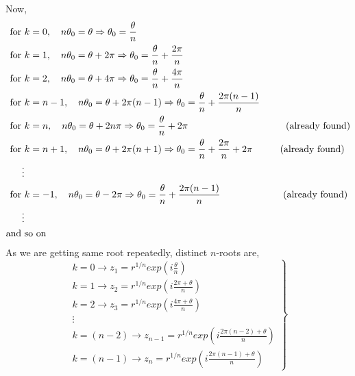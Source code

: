 \begin{ex}
\noindent Now,
\begin{align*}
   \text{for } & k=0, \quad n \theta_0=\theta \Rightarrow \theta_0=\frac{\theta}{n}\\
   \text{for } & k=1, \quad n \theta_0=\theta+2 \pi \Rightarrow \theta_0=\frac{\theta}{n}+\frac{2 \pi}{n}\\
   \text{for } & k=2, \quad n \theta_0=\theta+4 \pi \Rightarrow \theta_0=\frac{\theta}{n}+\frac{4 \pi}{n}\\
   \text{for } & k=n-1, \quad n \theta_0=\theta+2 \pi(n-1) \Rightarrow \theta_0=\frac{\theta}{n}+\frac{2 \pi(n-1)}{n}\\
   \text{for } & k=n, \quad n \theta_0=\theta+2 n \pi \Rightarrow \theta_0=\frac{\theta}{n}+2 \pi \text{\hspace{3.5cm} (already found)}\\
   \text{for } & k=n+1, \quad n \theta_0=\theta+2 \pi(n+1) \Rightarrow \theta_0=\frac{\theta}{n}+\frac{2\pi}{n}+2 \pi \text{\hspace{0.9cm} (already found)}\\
   \vdots\\
   \text{for } & k=-1, \quad n \theta_0=\theta-2 \pi \Rightarrow \theta_0=\frac{\theta}{n}+\frac{2\pi(n-1)}{n}\text{\hspace{2.2cm} (already found)}\\
   \vdots\\
   \text{and }& \text{so on}
\end{align*}
As we are getting same root repeatedly, distinct $n$-roots are,
$$
\left.\begin{array}{l}
k=0 \longrightarrow z_1=r^{1/n}exp\left(i\frac{\theta}{n}\right) \\
k=1 \longrightarrow z_2=r^{1/n}exp\left(i\frac{2 \pi+\theta}{n}\right) \\
k=2 \longrightarrow z_3=r^{1/n}exp\left(i\frac{4 \pi+\theta}{n}\right) \\
\vdots \\
k=(n-2) \longrightarrow z_{n-1}=r^{1/n}exp\left(i\frac{2 \pi(n-2)+\theta}{n}\right) \\
k=(n-1) \longrightarrow z_{n}=r^{1/n}exp\left(i\frac{2 \pi(n-1)+\theta}{n}\right)
\end{array}\right\} 
$$
\end{ex}
